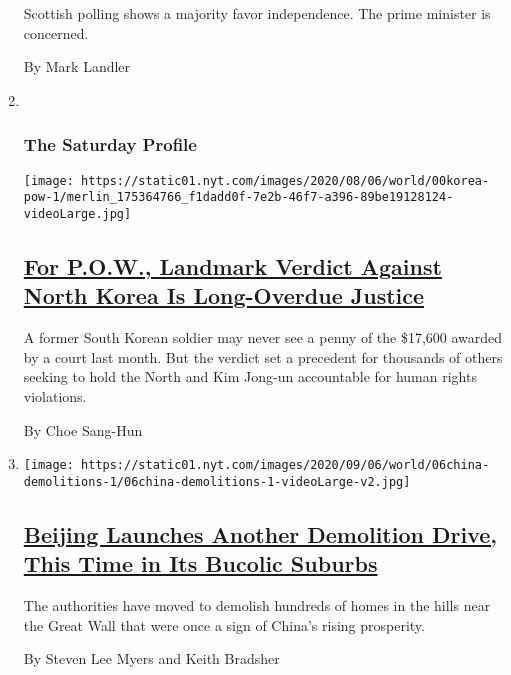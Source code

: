 \begin{enumerate}
  Scottish polling shows a majority favor independence. The prime
  minister is concerned.

  By Mark Landler
\item ~
  \hypertarget{the-saturday-profile}{%
  \subsubsection{The Saturday Profile}\label{the-saturday-profile}}

  \texttt{[image: https://static01.nyt.com/images/2020/08/06/world/00korea-pow-1/merlin\_175364766\_f1dadd0f-7e2b-46f7-a396-89be19128124-videoLarge.jpg]}

  \hypertarget{for-pow-landmark-verdict-against-north-korea-is-long-overdue-justice}{%
  \subsection{\texorpdfstring{\href{/2020/08/07/world/asia/north-korea-pow-verdict-kim.html}{For
  P.O.W., Landmark Verdict Against North Korea Is Long-Overdue
  Justice}}{For P.O.W., Landmark Verdict Against North Korea Is Long-Overdue Justice}}\label{for-pow-landmark-verdict-against-north-korea-is-long-overdue-justice}}

  A former South Korean soldier may never see a penny of the \$17,600
  awarded by a court last month. But the verdict set a precedent for
  thousands of others seeking to hold the North and Kim Jong-un
  accountable for human rights violations.

  By Choe Sang-Hun
\item
  \texttt{[image: https://static01.nyt.com/images/2020/09/06/world/06china-demolitions-1/06china-demolitions-1-videoLarge-v2.jpg]}

  \hypertarget{beijing-launches-another-demolition-drive-this-time-in-its-bucolic-suburbs}{%
  \subsection{\texorpdfstring{\href{/2020/08/07/world/asia/china-beijing-crackdown-housing.html}{Beijing
  Launches Another Demolition Drive, This Time in Its Bucolic
  Suburbs}}{Beijing Launches Another Demolition Drive, This Time in Its Bucolic Suburbs}}\label{beijing-launches-another-demolition-drive-this-time-in-its-bucolic-suburbs}}

  The authorities have moved to demolish hundreds of homes in the hills
  near the Great Wall that were once a sign of China's rising
  prosperity.

  By Steven Lee Myers and Keith Bradsher
\end{enumerate}

